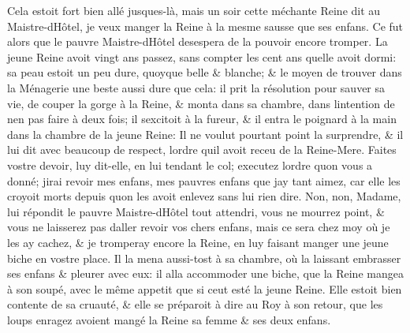 \documentclass[14pt,a4paper]{memoir}
\begin{document}
{{\begin{otherlanguage}{french}
Cela estoit fort bien allé jusques-là, mais un soir cette méchante Reine
dit au Maistre-d\textquotesingle Hôtel, je veux manger la Reine à la
mesme sausse que ses enfans. Ce fut alors que le pauvre
Maistre-d\textquotesingle Hôtel desespera de la pouvoir encore tromper.
La jeune Reine avoit vingt ans passez, sans compter les cent ans
qu\textquotesingle elle avoit dormi: sa peau estoit un peu dure, quoyque
belle \& blanche; \& le moyen de trouver dans la Ménagerie une beste
aussi dure que cela: il prit la résolution pour sauver sa vie, de couper
la gorge à la Reine, \& monta dans sa chambre, dans
l\textquotesingle intention de n\textquotesingle en pas faire à deux
fois; il s\textquotesingle excitoit à la fureur, \& il entra le poignard
à la main dans la chambre de la jeune Reine: Il ne voulut pourtant point
la surprendre, \& il lui dit avec beaucoup de respect,
l\textquotesingle ordre qu\textquotesingle il avoit receu de la
Reine-Mere. Faites vostre devoir, luy dit-elle, en lui tendant le col;
executez l\textquotesingle ordre qu\textquotesingle on vous a donné;
j\textquotesingle irai revoir mes enfans, mes pauvres enfans que
j\textquotesingle ay tant aimez, car elle les croyoit morts depuis
qu\textquotesingle on les avoit enlevez sans lui rien dire. Non, non,
Madame, lui répondit le pauvre Maistre-d\textquotesingle Hôtel tout
attendri, vous ne mourrez point, \& vous ne laisserez pas
d\textquotesingle aller revoir vos chers enfans, mais ce sera chez moy
où je les ay cachez, \& je tromperay encore la Reine, en luy faisant
manger une jeune biche en vostre place. Il la mena aussi-tost à sa
chambre, où la laissant embrasser ses enfans \& pleurer avec eux: il
alla accommoder une biche, que la Reine mangea à son soupé, avec le même
appetit que si c\textquotesingle eut esté la jeune Reine. Elle estoit
bien contente de sa cruauté, \& elle se préparoit à dire au Roy à son
retour, que les loups enragez avoient mangé la Reine sa femme \& ses
deux enfans.


\end{otherlanguage}}}
\end{document}
